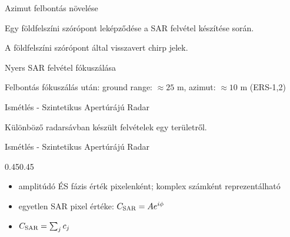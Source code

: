 \def\ft{Azimut felbontás növelése}

\begin{frame}{\ft}
    \begin{center}
    \begin{minipage}[b]{0.4\textwidth}
        \centering
        
        Egy földfelszíni szórópont leképződése a SAR felvétel készítése során.
    \end{minipage}
    \hspace{10pt}
    \begin{minipage}[b]{0.5\textwidth}
        \centering
        
        A földfelszíni szórópont által visszavert chirp jelek.
    \end{minipage}
    \end{center}
\end{frame}


\def\ft{Nyers SAR felvétel fókuszálása}

\begin{frame}{\ft}
    \begin{minic}{0.70}
        
        \centering
        Felbontás fókuszálás után: ground range: $\approx 25$ m, azimut: $\approx 10$ m (ERS-1,2)
    \end{minic}
\end{frame}


\def\ft{Ismétlés - Szintetikus Apertúrájú Radar}

\begin{frame}{\ft}
    \begin{minic}{0.80}
        
        \centering
        Különböző radarsávban készült felvételek egy területről.
    \end{minic}
\end{frame}


\begin{frame}{\ft}
    \begin{figp}{}{}{0.45}{0.45}
        \begin{itemize}
            \item amplitúdó ÉS fázis érték pixelenként; komplex számként reprezentálható
            \item egyetlen SAR pixel értéke: $C_{\text{SAR}} = A e^{i\phi}$
            \item $C_{\text{SAR}} = \sum_j c_j$
        \end{itemize}
    \end{figp}
\end{frame}


